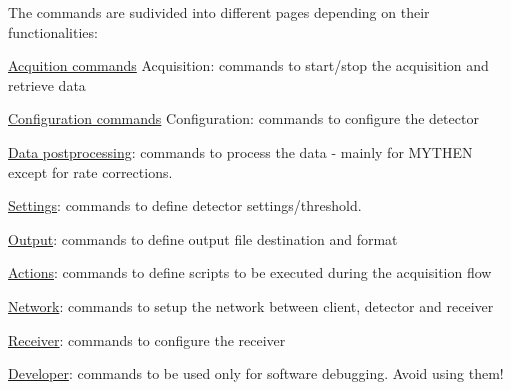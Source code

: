 The commands are sudivided into different pages depending on their functionalities:
\begin{DoxyItemize}
\item \hyperlink{acquisition}{Acquition commands} Acquisition: commands to start/stop the acquisition and retrieve data
\item \hyperlink{config}{Configuration commands} Configuration: commands to configure the detector
\item \hyperlink{data}{Data postprocessing}: commands to process the data -\/ mainly for MYTHEN except for rate corrections.
\item \hyperlink{settings}{Settings}: commands to define detector settings/threshold.
\item \hyperlink{output}{Output}: commands to define output file destination and format
\item \hyperlink{actions}{Actions}: commands to define scripts to be executed during the acquisition flow
\item \hyperlink{network}{Network}: commands to setup the network between client, detector and receiver
\item \hyperlink{receiver}{Receiver}: commands to configure the receiver
\item \hyperlink{test}{Developer}: commands to be used only for software debugging. Avoid using them! 
\end{DoxyItemize}